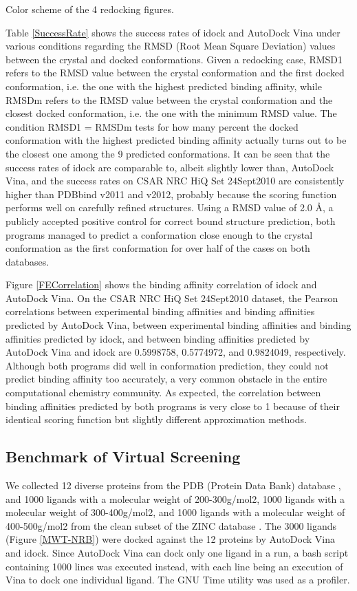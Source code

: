 \documentclass[10pt]{article}
\begin{document}
Color scheme of the 4 redocking figures.

Table \ref{SuccessRate} shows the success rates of idock and AutoDock Vina under various conditions regarding the RMSD (Root Mean Square Deviation) values between the crystal and docked conformations. Given a redocking case, RMSD1 refers to the RMSD value between the crystal conformation and the first docked conformation, i.e. the one with the highest predicted binding affinity, while RMSDm refers to the RMSD value between the crystal conformation and the closest docked conformation, i.e. the one with the minimum RMSD value. The condition RMSD1 = RMSDm tests for how many percent the docked conformation with the highest predicted binding affinity actually turns out to be the closest one among the 9 predicted conformations. It can be seen that the success rates of idock are comparable to, albeit slightly lower than, AutoDock Vina, and the success rates on CSAR NRC HiQ Set 24Sept2010 are consistently higher than PDBbind v2011 and v2012, probably because the scoring function performs well on carefully refined structures. Using a RMSD value of 2.0 \AA, a publicly accepted positive control for correct bound structure prediction, both programs managed to predict a conformation close enough to the crystal conformation as the first conformation for over half of the cases on both databases.

Figure \ref{FECorrelation} shows the binding affinity correlation of idock and AutoDock Vina. On the CSAR NRC HiQ Set 24Sept2010 dataset, the Pearson correlations between experimental binding affinities and binding affinities predicted by AutoDock Vina, between experimental binding affinities and binding affinities predicted by idock, and between binding affinities predicted by AutoDock Vina and idock are 0.5998758, 0.5774972, and 0.9824049, respectively. Although both programs did well in conformation prediction, they could not predict binding affinity too accurately, a very common obstacle in the entire computational chemistry community. As expected, the correlation between binding affinities predicted by both programs is very close to 1 because of their identical scoring function but slightly different approximation methods.

\subsection*{Benchmark of Virtual Screening}
We collected 12 diverse proteins from the PDB (Protein Data Bank) database \cite{540,537}, and 1000 ligands with a molecular weight of 200-300g/mol2, 1000 ligands with a molecular weight of 300-400g/mol2, and 1000 ligands with a molecular weight of 400-500g/mol2 from the clean subset of the ZINC database \cite{532,1178}. The 3000 ligands (Figure \ref{MWT-NRB}) were docked against the 12 proteins by AutoDock Vina and idock. Since AutoDock Vina can dock only one ligand in a run, a bash script containing 1000 lines was executed instead, with each line being an execution of Vina to dock one individual ligand. The GNU Time utility was used as a profiler.
\end{document}
